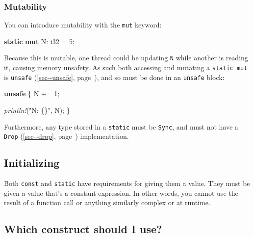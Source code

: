 \documentclass[a4paper,]{book}
\renewcommand*{\hypertarget}[3][\ar]{%
  \def\ar{#2}%
  \label{#1}%
  #3}
\renewcommand*{\hyperlink}[2]{%
 #2 (\autoref{#1}, page~\pageref{#1})}
\newenvironment{Shaded}{\begin{snugshade}}{\end{snugshade}}
\newcommand{\KeywordTok}[1]{\textcolor[rgb]{0.13,0.29,0.53}{\textbf{{#1}}}}
\newcommand{\DataTypeTok}[1]{\textcolor[rgb]{0.13,0.29,0.53}{{#1}}}
\newcommand{\DecValTok}[1]{\textcolor[rgb]{0.00,0.00,0.81}{{#1}}}
\newcommand{\StringTok}[1]{\textcolor[rgb]{0.31,0.60,0.02}{{#1}}}
\newcommand{\PreprocessorTok}[1]{\textcolor[rgb]{0.56,0.35,0.01}{\textit{{#1}}}}
\newcommand{\NormalTok}[1]{{#1}}
\begin{document}
\hypertarget{mutability-1}{\subsubsection{Mutability}\label{mutability-1}}

You can introduce mutability with the \texttt{mut} keyword:

\begin{Shaded}
\begin{Highlighting}[]
\KeywordTok{static} \KeywordTok{mut} \NormalTok{N: }\DataTypeTok{i32} \NormalTok{= }\DecValTok{5}\NormalTok{;}
\end{Highlighting}
\end{Shaded}

Because this is mutable, one thread could be updating \texttt{N} while
another is reading it, causing memory unsafety. As such both accessing
and mutating a \texttt{static\ mut} is
\protect\hyperlink{sec--unsafe}{\texttt{unsafe}}, and so must be done in
an \texttt{unsafe} block:

\begin{Shaded}
\begin{Highlighting}[]

\KeywordTok{unsafe} \NormalTok{\{}
    \NormalTok{N += }\DecValTok{1}\NormalTok{;}

    \PreprocessorTok{println!}\NormalTok{(}\StringTok{"N: \{\}"}\NormalTok{, N);}
\NormalTok{\}}
\end{Highlighting}
\end{Shaded}

Furthermore, any type stored in a \texttt{static} must be \texttt{Sync},
and must not have a \protect\hyperlink{sec--drop}{\texttt{Drop}}
implementation.

\subsection{Initializing}\label{initializing}

Both \texttt{const} and \texttt{static} have requirements for giving
them a value. They must be given a value that's a constant expression.
In other words, you cannot use the result of a function call or anything
similarly complex or at runtime.

\subsection{Which construct should I
use?}\label{which-construct-should-i-use}
\end{document}
